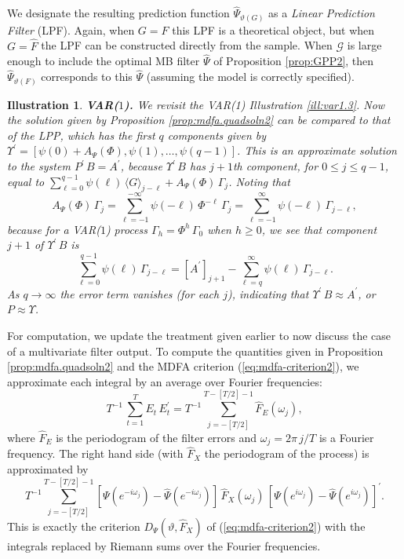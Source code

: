 \documentclass[a4paper]{book}
\def\tends{\rightarrow}
\newtheorem{Illustration}{Illustration}
\begin{document}
 
  We designate the resulting   prediction function
$\widehat{\Psi}_{ {\vartheta} (G)}$  as  a {\em Linear
Prediction Filter} (LPF).   Again, when $G=F$ this LPF is a theoretical
 object, but when $G = \widehat{F}$ the LPF can be constructed directly from the sample.
  When $\mathcal{G}$ is large enough to include the optimal MB filter
 $\widehat{\Psi}  $ of Proposition  \ref{prop:GPP2},  then
 $\widehat{\Psi}_{ {\vartheta} (F)} $ corresponds to  this 
 $\widehat{\Psi}$ (assuming  the model 
 is correctly specified).
 
  

\begin{Illustration} {\bf VAR($1$).}  \rm
\label{ill:var1.3-alt}
  We revisit the VAR(1) Illustration \ref{ill:var1.3}.
  Now  the solution given by Proposition \ref{prop:mdfa.quadsoln2}
 can be compared to that of the LPP, which has the first $q$ components
 given by $  \Upsilon^{\prime} = [ \psi (0) + A_{\Psi} (\Phi), \psi (1),
 \ldots, \psi (q-1)  ]$.
 This is an approximate solution to the system $P^{\prime} \, B
 =  A^{\prime}$, because
 $  \Upsilon^{\prime} \, B $ has $j+1$th component, for $0 \leq j \leq q-1$,
 equal to  $   \sum_{\ell=0}^{q-1} \psi (\ell) \, {\langle G \rangle }_{j-\ell}
 + A_{\Psi} (\Phi) \, \Gamma_j$.  Noting that
\[
 A_{\Psi} (\Phi) \, \Gamma_j
 = \sum_{\ell = -1 }^{-\infty} \psi (-\ell) \, \Phi^{-\ell} \, \Gamma_j
 = \sum_{\ell = -1}^{\infty} \psi (-\ell) \, \Gamma_{j- \ell},
\]
 because for a VAR($1$) process $\Gamma_h = \Phi^h \, \Gamma_0$ when
 $h \geq 0$, we see that component $j+1$ of $\Upsilon^{\prime} \, B$ is
\[
  \sum_{\ell =0 }^{ q-1} \psi (\ell) \, \Gamma_{j-\ell}
  =  {[   A^{\prime} ]}_{j+1} - \sum_{\ell = q}^{\infty} \psi (\ell) \, \Gamma_{j-\ell}.
\]
 As $q \tends \infty$ the error term vanishes (for each $j$), indicating
 that $\Upsilon^{\prime} \, B \approx  A^{\prime}$, or
 $P \approx \Upsilon$.
\end{Illustration}
 
 For computation, we update the treatment given earlier to now discuss the 
 case of a multivariate filter output.
To compute the quantities given in Proposition \ref{prop:mdfa.quadsoln2} and  
the MDFA criterion (\ref{eq:mdfa-criterion2}), we 
approximate each integral by an average over Fourier frequencies: 
\[
  T^{-1} \, \sum_{t=1}^T E_t \, E_t^{\prime} =
  T^{-1} \sum_{j=-[T/2]}^{T-[T/2]-1}   \widehat{F}_{E} (\omega_{j}),
\]
 where $  \widehat{F}_{E}$ is the periodogram of the 
 filter errors and $\omega_j = 2 \pi \, j/T $ is
 a Fourier frequency.   The right hand side
 (with $ \widehat{F}_X$ the periodogram of the process)  is approximated  by 
\[
 T^{-1} \sum_{j=-[T/2]}^{T-[T/2]-1}  \left[ \Psi (e^{-i \omega_{j} }) - \widehat{\Psi} (e^{-i \omega_{j} }) \right] \,
     \widehat{F}_X (\omega_{j}) \,
 {\left[ \Psi (e^{i \omega_{j} }) - \widehat{\Psi}( e^{i \omega_{j} }) \right]}^{\prime}.
\]
   This is exactly the   criterion $D_{\Psi} (\vartheta,  \widehat{F}_X)$ of
 (\ref{eq:mdfa-criterion2}) with the integrals replaced by Riemann
 sums over the Fourier frequencies.
\end{document}
